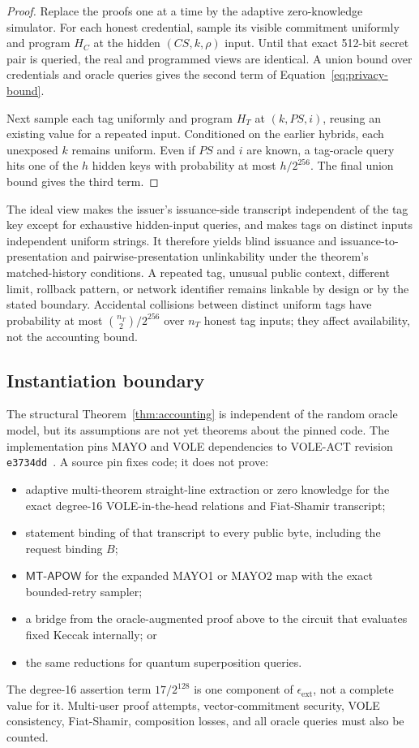 \documentclass[11pt]{article}
\newcommand{\domain}[1]{\texttt{#1}}
\theoremstyle{remark}
\begin{document}
\begin{proof}
Replace the proofs one at a time by the adaptive zero-knowledge simulator.
For each honest credential, sample its visible commitment uniformly and
program $H_C$ at the hidden $(CS,k,\rho)$ input. Until that exact 512-bit
secret pair is queried, the real and programmed views are identical. A union
bound over credentials and oracle queries gives the second term of
Equation~\eqref{eq:privacy-bound}.

Next sample each tag uniformly and program $H_T$ at
$(k,PS,i)$, reusing an existing value for a repeated input. Conditioned on
the earlier hybrids, each unexposed $k$ remains uniform. Even if $PS$ and
$i$ are known, a tag-oracle query hits one of the $h$ hidden keys with
probability at most $h/2^{256}$. The final union bound gives the third term.
\end{proof}

The ideal view makes the issuer's issuance-side transcript independent of the
tag key except for exhaustive hidden-input queries, and makes tags on distinct
inputs independent uniform strings. It therefore yields blind issuance and
issuance-to-presentation and pairwise-presentation unlinkability under the
theorem's matched-history conditions. A repeated tag, unusual public context,
different limit, rollback pattern, or network identifier remains linkable by
design or by the stated boundary. Accidental collisions between distinct
uniform tags have probability at most $\binom{n_T}{2}/2^{256}$ over $n_T$
honest tag inputs; they affect availability, not the accounting bound.

\subsection{Instantiation boundary}

The structural Theorem~\ref{thm:accounting} is independent of the random
oracle model, but its assumptions are not yet theorems about the pinned code.
The implementation pins MAYO and VOLE dependencies to VOLE-ACT revision
\domain{e3734dd}~\cite{vole-act}. A source pin fixes code; it does not prove:
\begin{itemize}
  \item adaptive multi-theorem straight-line extraction or zero knowledge for
        the exact degree-16 VOLE-in-the-head relations and Fiat-Shamir
        transcript;
  \item statement binding of that transcript to every public byte, including
        the request binding $B$;
  \item $\mathsf{MT\text{-}APOW}$ for the expanded MAYO1 or MAYO2 map with
        the exact bounded-retry sampler;
  \item a bridge from the oracle-augmented proof above to the circuit that
        evaluates fixed Keccak internally; or
  \item the same reductions for quantum superposition queries.
\end{itemize}
The degree-16 assertion term $17/2^{128}$ is one component of
$\epsilon_{\mathrm{ext}}$, not a complete value for it. Multi-user proof
attempts, vector-commitment security, VOLE consistency, Fiat-Shamir,
composition losses, and all oracle queries must also be counted.
\end{document}
